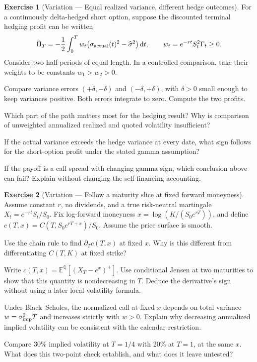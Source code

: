 \documentclass[11pt]{article}
\newcommand{\E}{\mathbb E}
\newcommand{\Qbb}{\mathbb Q}
\newcommand{\dd}{\,\mathrm d}
\theoremstyle{definition}
\newtheorem{exercise}{Exercise}[section]
\begin{document}
\begin{exercise}[Variation --- Equal realized variance, different hedge outcomes]
For a continuously delta-hedged short option, suppose the discounted
terminal hedging profit can be written
\[
\widetilde\Pi_T=-\frac12\int_0^T w_t
\bigl(\sigma_{\rm actual}(t)^2-\widehat\sigma^2\bigr)\dd t,
\qquad w_t=e^{-rt}S_t^2\Gamma_t\geq0.
\]
Consider two half-periods of equal length. In a controlled comparison,
take their weights to be constants \(w_1>w_2>0\).
\begin{exparts}
\item Compare variance errors \((+\delta,-\delta)\) and \((-\delta,+\delta)\), with \(\delta>0\) small enough to keep variances positive. Both errors integrate to zero. Compute the two profits.
\item Which part of the path matters most for the hedging result? Why is comparison of unweighted annualized realized and quoted volatility insufficient?
\item If the actual variance exceeds the hedge variance at every date, what sign follows for the short-option profit under the stated gamma assumption?
\item If the payoff is a call spread with changing gamma sign, which conclusion above can fail? Explain without changing the self-financing accounting.
\end{exparts}
\end{exercise}

\begin{exercise}[Variation --- Follow a maturity slice at fixed forward moneyness]
Assume constant \(r\), no dividends, and a true risk-neutral martingale
\(X_t=e^{-rt}S_t/S_0\). Fix log-forward moneyness
\(x=\log(K/(S_0e^{rT}))\), and define
\(c(T,x)=C(T,S_0e^{rT+x})/S_0\). Assume the price surface is smooth.
\begin{exparts}
\item Use the chain rule to find \(\partial_T c(T,x)\) at fixed \(x\). Why is this different from differentiating \(C(T,K)\) at fixed strike?
\item Write \(c(T,x)=\E^{\Qbb}[(X_T-e^x)^+]\). Use conditional Jensen at two maturities to show that this quantity is nondecreasing in \(T\). Deduce the derivative's sign without using a later local-volatility formula.
\item Under Black--Scholes, the normalized call at fixed \(x\) depends on total variance \(w=\sigma_{\rm imp}^2T\) and increases strictly with \(w>0\). Explain why decreasing annualized implied volatility can be consistent with the calendar restriction.
\item Compare 30\% implied volatility at \(T=1/4\) with 20\% at \(T=1\), at the same \(x\). What does this two-point check establish, and what does it leave untested?
\end{exparts}
\end{exercise}
\end{document}

